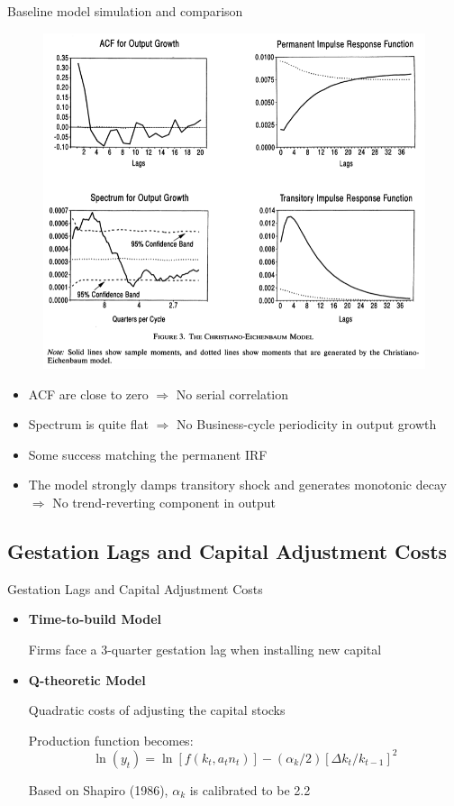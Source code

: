 \documentclass[10pt]{beamer}
\begin{document}
\begin{frame}{Baseline model simulation and comparison}
    \begin{figure}
        \centering
        \includegraphics[width=0.57\linewidth]{figures/baseline_all.png}
    \end{figure}
    \small
    \begin{itemize}
        \item  ACF are close to zero $\Rightarrow$ No serial correlation
        \item Spectrum is quite flat $\Rightarrow$ No Business-cycle periodicity in output
              growth
        \item Some success matching the permanent IRF
        \item The model strongly damps transitory shock and generates monotonic decay
              $\Rightarrow$ No trend-reverting component in output
    \end{itemize}
\end{frame}

\subsection{Gestation Lags and Capital Adjustment Costs}

\begin{frame}{Gestation Lags and Capital Adjustment Costs}

    \begin{itemize}
        \item \textbf{Time-to-build Model}

              Firms face a 3-quarter gestation lag when installing new capital

        \item \textbf{Q-theoretic Model}

              Quadratic costs of adjusting the capital stocks

              Production function becomes: $$ \ln \left(y_t\right)= \ln \left[f\left(k_t, a_t
                      n_t\right)\right] -\left(\alpha_{k} / 2\right)\left[\Delta k_t /
                      k_{t-1}\right]^2 $$

              Based on Shapiro (1986), $\alpha_{k}$ is calibrated to be 2.2
    \end{itemize}

\end{frame}
\end{document}
